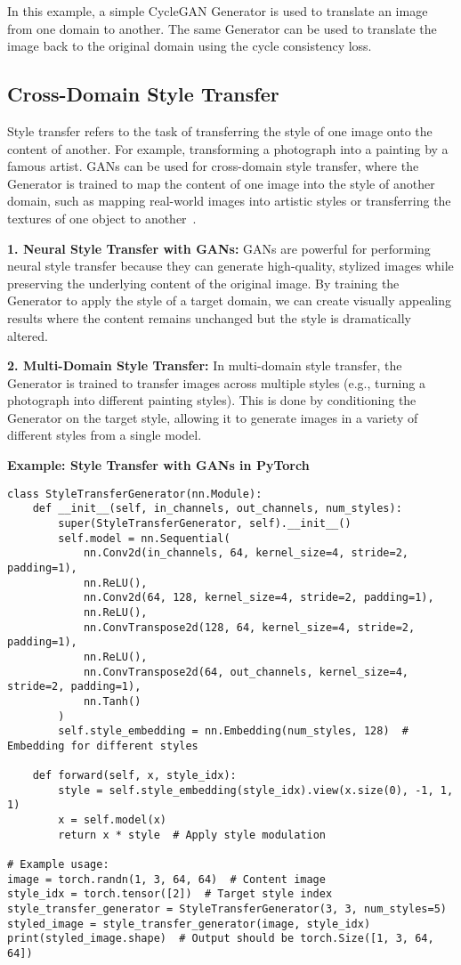In this example, a simple CycleGAN Generator is used to translate an image from one domain to another. The same Generator can be used to translate the image back to the original domain using the cycle consistency loss.

\subsection{Cross-Domain Style Transfer}
Style transfer refers to the task of transferring the style of one image onto the content of another. For example, transforming a photograph into a painting by a famous artist. GANs can be used for cross-domain style transfer, where the Generator is trained to map the content of one image into the style of another domain, such as mapping real-world images into artistic styles or transferring the textures of one object to another~\cite{chu2017cyclegan}.

\textbf{1. Neural Style Transfer with GANs:}  
GANs are powerful for performing neural style transfer because they can generate high-quality, stylized images while preserving the underlying content of the original image. By training the Generator to apply the style of a target domain, we can create visually appealing results where the content remains unchanged but the style is dramatically altered.

\textbf{2. Multi-Domain Style Transfer:}  
In multi-domain style transfer, the Generator is trained to transfer images across multiple styles (e.g., turning a photograph into different painting styles). This is done by conditioning the Generator on the target style, allowing it to generate images in a variety of different styles from a single model.

\textbf{Example: Style Transfer with GANs in PyTorch}

\begin{lstlisting}[style=python]
class StyleTransferGenerator(nn.Module):
    def __init__(self, in_channels, out_channels, num_styles):
        super(StyleTransferGenerator, self).__init__()
        self.model = nn.Sequential(
            nn.Conv2d(in_channels, 64, kernel_size=4, stride=2, padding=1),
            nn.ReLU(),
            nn.Conv2d(64, 128, kernel_size=4, stride=2, padding=1),
            nn.ReLU(),
            nn.ConvTranspose2d(128, 64, kernel_size=4, stride=2, padding=1),
            nn.ReLU(),
            nn.ConvTranspose2d(64, out_channels, kernel_size=4, stride=2, padding=1),
            nn.Tanh()
        )
        self.style_embedding = nn.Embedding(num_styles, 128)  # Embedding for different styles

    def forward(self, x, style_idx):
        style = self.style_embedding(style_idx).view(x.size(0), -1, 1, 1)
        x = self.model(x)
        return x * style  # Apply style modulation

# Example usage:
image = torch.randn(1, 3, 64, 64)  # Content image
style_idx = torch.tensor([2])  # Target style index
style_transfer_generator = StyleTransferGenerator(3, 3, num_styles=5)
styled_image = style_transfer_generator(image, style_idx)
print(styled_image.shape)  # Output should be torch.Size([1, 3, 64, 64])
\end{lstlisting}

